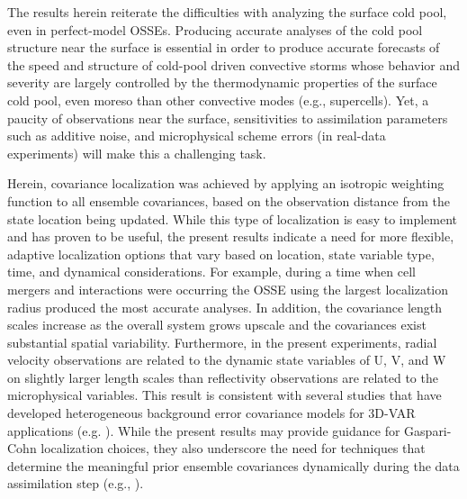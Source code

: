 The results herein reiterate the difficulties with analyzing the surface cold pool, even in perfect-model OSSEs. Producing accurate analyses of the cold pool structure near the surface is essential in order to produce accurate forecasts of the speed and structure of cold-pool driven convective storms whose behavior and severity are largely controlled by the thermodynamic properties of the surface cold pool, even moreso than other convective modes (e.g., supercells). Yet, a paucity of observations near the surface, sensitivities to assimilation parameters such as additive noise, and microphysical scheme errors (in real-data experiments) will make this a challenging task.

Herein, covariance localization was achieved by applying an isotropic weighting function to all ensemble covariances, based on the observation distance from the state location being updated. While this type of localization is easy to implement and has proven to be useful, the present results indicate a need for more flexible, adaptive localization options that vary based on location, state variable type, time, and dynamical considerations. For example, during a time when cell mergers and interactions were occurring the OSSE using the largest localization radius produced the most accurate analyses. In addition, the covariance length scales increase as the overall system grows upscale and the covariances exist substantial spatial variability. Furthermore, in the present experiments, radial velocity observations are related to the dynamic state variables of U, V, and W on slightly larger length scales than reflectivity observations are related to the microphysical variables. This result is consistent with several studies that have developed heterogeneous background error covariance models for 3D-VAR applications (e.g. \citealt{micheletal11}). While the present results may provide guidance for Gaspari-Cohn localization choices, they also underscore the need for techniques that determine the meaningful prior ensemble covariances dynamically during the data assimilation step (e.g., \citealt{bishophodyss09a,bishophodyss09b,chenoliver09}).
